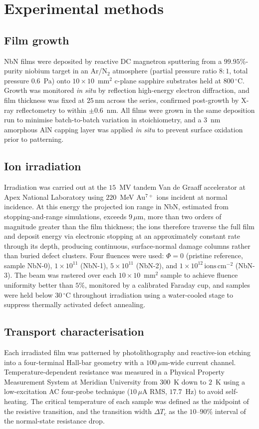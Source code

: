 \section{Experimental methods}
\label{sec:methods}

\subsection{Film growth}
NbN films were deposited by reactive DC magnetron sputtering from a $99.95\%$-purity niobium target in an Ar/N$_2$ atmosphere (partial pressure ratio $8:1$, total pressure $0.6$~Pa) onto $10\times10$~mm$^2$ c-plane sapphire substrates held at $800\,^{\circ}$C. Growth was monitored \textit{in situ} by reflection high-energy electron diffraction, and film thickness was fixed at $25\,\mathrm{nm}$ across the series, confirmed post-growth by X-ray reflectometry to within $\pm 0.6$~nm. All films were grown in the same deposition run to minimise batch-to-batch variation in stoichiometry, and a $3$~nm amorphous AlN capping layer was applied \textit{in situ} to prevent surface oxidation prior to patterning.

\subsection{Ion irradiation}
Irradiation was carried out at the $15$~MV tandem Van de Graaff accelerator at Apex National Laboratory using $220$~MeV Au$^{7+}$ ions incident at normal incidence. At this energy the projected ion range in NbN, estimated from stopping-and-range simulations, exceeds $9\,\mu\mathrm{m}$, more than two orders of magnitude greater than the film thickness; the ions therefore traverse the full film and deposit energy via electronic stopping at an approximately constant rate through its depth, producing continuous, surface-normal damage columns rather than buried defect clusters. Four fluences were used: $\Phi = 0$ (pristine reference, sample NbN-0), $1\times10^{11}$ (NbN-1), $5\times10^{11}$ (NbN-2), and $1\times10^{12}\,\mathrm{ions\,cm^{-2}}$ (NbN-3). The beam was rastered over each $10\times10$~mm$^2$ sample to achieve fluence uniformity better than $5\%$, monitored by a calibrated Faraday cup, and samples were held below $30\,^{\circ}$C throughout irradiation using a water-cooled stage to suppress thermally activated defect annealing.

\subsection{Transport characterisation}
Each irradiated film was patterned by photolithography and reactive-ion etching into a four-terminal Hall-bar geometry with a $100\,\mu\mathrm{m}$-wide current channel. Temperature-dependent resistance was measured in a Physical Property Measurement System at Meridian University from $300$~K down to $2$~K using a low-excitation AC four-probe technique ($10\,\mu\mathrm{A}$ RMS, $17.7$~Hz) to avoid self-heating. The critical temperature of each sample was defined as the midpoint of the resistive transition, and the transition width $\Delta T_c$ as the $10$--$90\%$ interval of the normal-state resistance drop.

